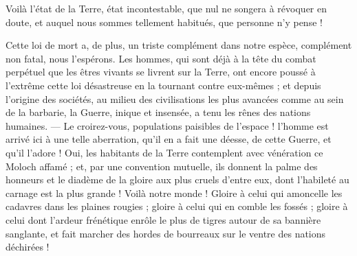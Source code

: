 \documentclass[a4paper, 11pt, oneside]{article}
\begin{document}
Voilà l'état de la Terre, état incontestable, que nul ne songera à révoquer en doute, et auquel nous sommes tellement habitués, que personne n'y pense !

Cette loi de mort a, de plus, un triste complément dans notre espèce, complément non fatal, nous l'espérons. Les hommes, qui sont déjà à la tête du combat perpétuel que les êtres vivants se livrent sur la Terre, ont encore poussé à l'extrême cette loi désastreuse en la tournant contre eux-mêmes ; et depuis l'origine des sociétés, au milieu des civilisations les plus avancées comme au sein de la barbarie, la Guerre, inique et insensée, a tenu les rênes des nations humaines. --- Le croirez-vous, populations paisibles de l'espace ! l'homme est arrivé ici à une telle aberration, qu'il en a fait une déesse, de cette Guerre, et qu'il l'adore ! Oui, les habitants de la Terre contemplent avec vénération ce Moloch affamé ; et, par une convention mutuelle, ils donnent la palme des honneurs et le diadème de la gloire aux plus cruels d'entre eux, dont l'habileté au carnage est la plus grande ! Voilà notre monde ! Gloire à celui qui amoncelle les cadavres dans les plaines rougies ; gloire à celui qui en comble les fossés ; gloire à celui dont l'ardeur frénétique enrôle le plus de tigres autour de sa bannière sanglante, et fait marcher des hordes de bourreaux sur le ventre des nations déchirées !
\end{document}
